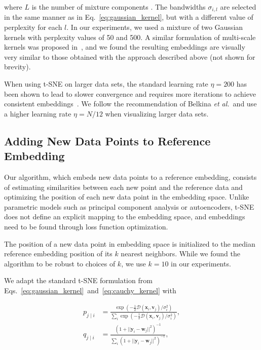 \documentclass[runningheads]{llncs}
\newcommand{\etal}{\textit{et al.}}
\providecommand{\DIFaddtex}[1]{{\protect\color{blue}\uwave{#1}}} %
\providecommand{\DIFaddbegin}{} %
\providecommand{\DIFaddend}{} %
\providecommand{\DIFadd}[1]{\texorpdfstring{\DIFaddtex{#1}}{#1}} %
\newcommand{\DIFaddincludegraphics}[2][]{{\color{blue}\fbox{\DIFOincludegraphics[#1]{#2}}}} %
\DeclareRobustCommand{\DIFaddbegin}{\DIFOaddbegin \let\includegraphics\DIFaddincludegraphics} %
\DeclareRobustCommand{\DIFaddend}{\DIFOaddend \let\includegraphics\DIFOincludegraphics} %
\begin{document}
\noindent where $L$ is the number of mixture components \DIFaddbegin \DIFadd{as specified by the user}\DIFaddend . The bandwidths
$\sigma_{i,l}$ are selected in the same manner as in
Eq.~\ref{eq:gaussian_kernel}, but with a different value of perplexity for each
$l$. In our experiments, we used a mixture of two Gaussian kernels with
perplexity values of 50 and 500. A similar formulation of multi-scale kernels
was proposed in~\cite{Kobak2019}, and we found the resulting embeddings are
visually very similar to those obtained with the approach described above (not
shown for brevity).

When using t-SNE on larger data sets, the standard learning rate $\eta = 200$
has been shown to lead to slower convergence and requires more iterations to
achieve consistent embeddings~\cite{Belkina2019}. We follow the recommendation
of Belkina \etal ~and use a higher learning rate $\eta = N / 12$ when
visualizing larger data sets.


\subsection{Adding New Data Points to Reference Embedding\label{sec:transfer}}

Our algorithm, which embeds new data points to a reference embedding, consists
of estimating similarities between each new point and the reference data and
optimizing the position of each new data point in the embedding space. Unlike
parametric models such as principal component analysis or autoencoders, t-SNE
does not define an explicit mapping to the embedding space, and embeddings need
to be found through loss function optimization.

The position of a new data point in embedding space is initialized to the median
reference embedding position of its $k$ nearest neighbors. While we found the
algorithm to be robust to choices of $k$, we use $k=10$ in our experiments.

We adapt the standard t-SNE formulation from
Eqs.~\ref{eq:gaussian_kernel}~and~\ref{eq:cauchy_kernel} with

\begin{align}
p_{j \mid i} &= \frac{\exp \left ( -\frac{1}{2} \mathcal{D}(\mathbf{x}_i, \mathbf{v}_j) / \sigma_i^2 \right )}{\sum_{i} \exp \left ( -\frac{1}{2} \mathcal{D}(\mathbf{x}_i, \mathbf{v}_j) / \sigma_i^2 \right )}, \\
q_{j \mid i} &= \frac{\left ( 1 + || \mathbf{y}_i - \mathbf{w}_j ||^2 \right )^{-1}}{\sum_{i}\left ( 1 + || \mathbf{y}_i - \mathbf{w}_j ||^2 \right )^{-1}},
\end{align}
\end{document}
